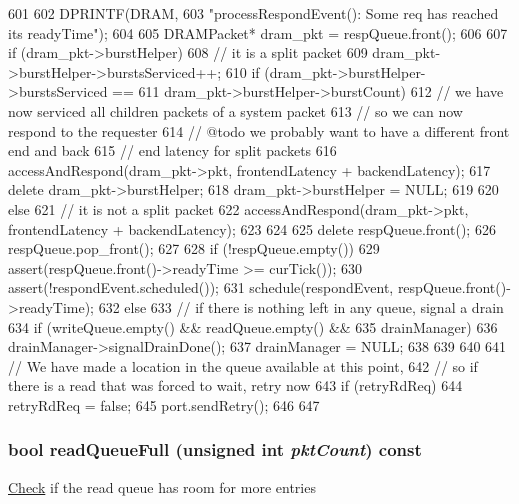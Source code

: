 \begin{DoxyCode}
601 {
602     DPRINTF(DRAM,
603             "processRespondEvent(): Some req has reached its readyTime\n");
604 
605     DRAMPacket* dram_pkt = respQueue.front();
606 
607     if (dram_pkt->burstHelper) {
608         // it is a split packet
609         dram_pkt->burstHelper->burstsServiced++;
610         if (dram_pkt->burstHelper->burstsServiced ==
611             dram_pkt->burstHelper->burstCount) {
612             // we have now serviced all children packets of a system packet
613             // so we can now respond to the requester
614             // @todo we probably want to have a different front end and back
615             // end latency for split packets
616             accessAndRespond(dram_pkt->pkt, frontendLatency + backendLatency);
617             delete dram_pkt->burstHelper;
618             dram_pkt->burstHelper = NULL;
619         }
620     } else {
621         // it is not a split packet
622         accessAndRespond(dram_pkt->pkt, frontendLatency + backendLatency);
623     }
624 
625     delete respQueue.front();
626     respQueue.pop_front();
627 
628     if (!respQueue.empty()) {
629         assert(respQueue.front()->readyTime >= curTick());
630         assert(!respondEvent.scheduled());
631         schedule(respondEvent, respQueue.front()->readyTime);
632     } else {
633         // if there is nothing left in any queue, signal a drain
634         if (writeQueue.empty() && readQueue.empty() &&
635             drainManager) {
636             drainManager->signalDrainDone();
637             drainManager = NULL;
638         }
639     }
640 
641     // We have made a location in the queue available at this point,
642     // so if there is a read that was forced to wait, retry now
643     if (retryRdReq) {
644         retryRdReq = false;
645         port.sendRetry();
646     }
647 }
\end{DoxyCode}
\hypertarget{classDRAMCtrl_a865d7144c26ea7f206d937e12935f840}{
\subsubsection[{readQueueFull}]{\setlength{\rightskip}{0pt plus 5cm}bool readQueueFull (unsigned int {\em pktCount}) const}}
\label{classDRAMCtrl_a865d7144c26ea7f206d937e12935f840}
\hyperlink{classCheck}{Check} if the read queue has room for more entries


